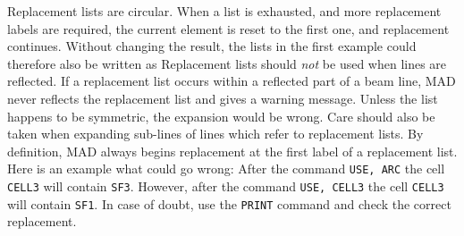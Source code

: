 Replacement lists are circular.
When a list is exhausted, and more replacement labels are required,
the current element is reset to the first one, and replacement continues.
Without changing the result,
the lists in the first example could therefore also be written as
Replacement lists should {\em not} be used when lines are reflected.
If a replacement list occurs within a reflected part of a beam line,
MAD never reflects the replacement list and gives a warning message.
Unless the list happens to be symmetric,
the expansion would be wrong.
Care should also be taken when expanding sub-lines of lines which refer
to replacement lists.
By definition, MAD always begins replacement at the first label
of a replacement list.
Here is an example what could go wrong:
After the command {\tt USE, ARC} the cell {\tt CELL3} will contain
{\tt SF3}.
However, after the command {\tt USE, CELL3} the cell {\tt CELL3}
will contain {\tt SF1}.
In case of doubt, use the {\tt PRINT} command and check the correct
replacement.
 
